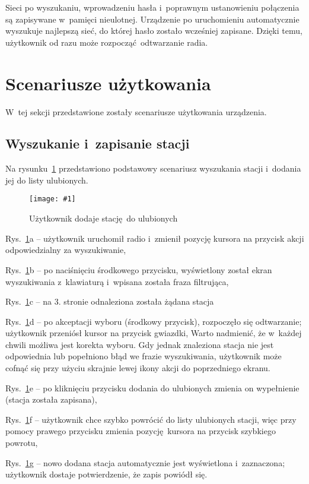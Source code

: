 \documentclass[polish]{aghengthesis}
\let\tempone\itemize
\let\temptwo\enditemize
\renewenvironment{itemize}{\tempone\setlength{\itemsep}{0cm}}{\temptwo}
\newcommand{\imgint}[4]{
	\begin{figure}[{#4}]
		\centering
		\texttt{[image: \#1]}
		\caption{#2}
		\label{#1}
	\end{figure}
}
\newcommand{\imgh}[3]{\imgint{#1}{#2}{#3}{H}}
\begin{document}
			Sieci po wyszukaniu, wprowadzeniu hasła i~poprawnym ustanowieniu połączenia są zapisywane w~pamięci nieulotnej. Urządzenie po uruchomieniu automatycznie wyszukuje najlepszą sieć, do której hasło zostało wcześniej zapisane. Dzięki temu, użytkownik od razu może rozpocząć odtwarzanie radia.
	
	\section{Scenariusze użytkowania}
		W~tej sekcji przedstawione zostały scenariusze użytkowania urządzenia.
	
		\subsection{Wyszukanie i~zapisanie stacji}
			\newcommand{\rfladd}[1]{\ref{5/PicoRadio-fl-add}#1}
			
			Na rysunku~\rfladd{} przedstawiono podstawowy scenariusz wyszukania stacji i~dodania jej do listy ulubionych.
			
			\imgh{5/PicoRadio-fl-add}{Użytkownik dodaje stację do ulubionych}{0.9}
			
			\begin{itemize}
				\item Rys.~\rfladd{a} -- użytkownik uruchomił radio i~zmienił pozycję kursora na przycisk akcji odpowiedzialny za wyszukiwanie,
				\item Rys.~\rfladd{b} -- po naciśnięciu środkowego przycisku, wyświetlony został ekran wyszukiwania z~klawiaturą i~wpisana została fraza filtrująca,
				\item Rys.~\rfladd{c} -- na 3. stronie odnaleziona została żądana stacja
				\item Rys.~\rfladd{d} -- po akceptacji wyboru (środkowy przycisk), rozpoczęło się odtwarzanie; użytkownik przeniósł kursor na przycisk gwiazdki,
			\end{itemize}
			Warto nadmienić, że w~każdej chwili możliwa jest korekta wyboru. Gdy jednak znaleziona stacja nie jest odpowiednia lub popełniono błąd we frazie wyszukiwania, użytkownik może cofnąć się przy użyciu skrajnie lewej ikony akcji do poprzedniego ekranu.
			\begin{itemize}
				\item Rys.~\rfladd{e} -- po kliknięciu przycisku dodania do ulubionych zmienia on wypełnienie (stacja została zapisana),
				\item Rys.~\rfladd{f} -- użytkownik chce szybko powrócić do listy ulubionych stacji, więc przy pomocy prawego przycisku zmienia pozycję kursora na przycisk szybkiego powrotu,
				\item Rys.~\rfladd{g} -- nowo dodana stacja automatycznie jest wyświetlona i~zaznaczona; użytkownik dostaje potwierdzenie, że zapis powiódł się.
			\end{itemize}
			
\end{document}
